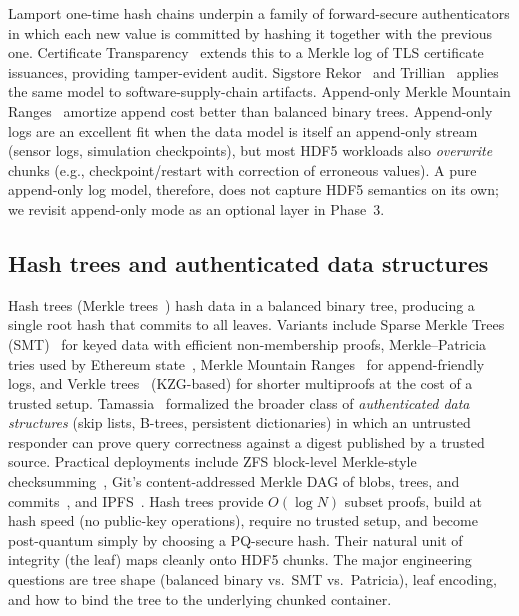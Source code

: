 \documentclass[11pt]{article}
\begin{document}
Lamport one-time hash chains underpin a family of forward-secure authenticators
in which each new value is committed by hashing it together with the previous
one. Certificate Transparency~\cite{rfc6962,laurie2014certificate} extends
this to a Merkle log of TLS certificate issuances, providing tamper-evident
audit. Sigstore Rekor~\cite{newman2022sigstore} and
Trillian~\cite{trillian} applies the same model to software-supply-chain
artifacts. Append-only Merkle Mountain Ranges~\cite{mmr} amortize append cost
better than balanced binary trees. Append-only logs are an excellent fit when
the data model is itself an append-only stream (sensor logs, simulation
checkpoints), but most HDF5 workloads also \emph{overwrite} chunks (e.g.,
checkpoint/restart with correction of erroneous values). A pure append-only
log model, therefore, does not capture HDF5 semantics on its own; we revisit
append-only mode as an optional layer in Phase~3.

\subsection{Hash trees and authenticated data structures}

Hash trees (Merkle trees~\cite{merkle1987tree}) hash data in a balanced binary
tree, producing a single root hash that commits to all leaves. Variants
include Sparse Merkle Trees (SMT)~\cite{laurendeau2008smt} for keyed data with
efficient non-membership proofs, Merkle--Patricia tries used by Ethereum
state~\cite{ethereumyellow}, Merkle Mountain Ranges~\cite{mmr} for
append-friendly logs, and Verkle trees~\cite{verkle} (KZG-based) for shorter
multiproofs at the cost of a trusted setup. Tamassia~\cite{tamassia2003authenticated}
formalized the broader class of \emph{authenticated data structures} (skip
lists, B-trees, persistent dictionaries) in which an untrusted responder can
prove query correctness against a digest published by a trusted source.
Practical deployments include ZFS block-level Merkle-style
checksumming~\cite{bonwick2003zfs}, Git's content-addressed Merkle DAG of
blobs, trees, and commits~\cite{git_internals}, and IPFS~\cite{benet2014ipfs}.
Hash trees provide $O(\log N)$ subset proofs, build at hash speed (no public-key
operations), require no trusted setup, and become post-quantum simply by
choosing a PQ-secure hash. Their natural unit of integrity (the leaf) maps
cleanly onto HDF5 chunks. The major engineering questions are tree shape
(balanced binary vs.\ SMT vs.\ Patricia), leaf encoding, and how to bind the
tree to the underlying chunked container.
\end{document}
